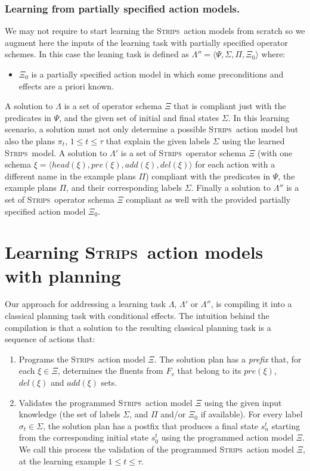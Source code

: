 \documentclass[letterpaper]{article} %
\newcommand{\tup}[1]{{\langle #1 \rangle}}
\newcommand{\strips}{\textsc{Strips}}     %
\begin{document}
\subsubsection{Learning from partially specified action models.}
We may not require to start learning the \strips\ action models from scratch so we augment here the inputs of the learning task with partially specified operator schemes. In this case the leaning task is defined as $\Lambda''=\tup{\Psi,\Sigma,\Pi,\Xi_0}$ where:
\begin{itemize}
\item $\Xi_0$ is a partially specified action model in which some preconditions and effects are a priori known.
\end{itemize}

A solution to $\Lambda$ is a set of operator schema $\Xi$ that is compliant just with the predicates in $\Psi$, and the given set of initial and final states $\Sigma$. In this learning scenario, a solution must not only determine a possible \strips\ action model but also the plans $\pi_t$, {\tt\small $1\leq t\leq \tau$} that explain the given labels $\Sigma$ using the learned \strips\ model. A solution to $\Lambda'$ is a set of \strips\ operator schema $\Xi$ (with one schema $\xi=\tup{head(\xi),pre(\xi),add(\xi),del(\xi)}$ for each action with a different name in the example plans $\Pi$) compliant with the predicates in $\Psi$, the example plans $\Pi$, and their corresponding labels $\Sigma$.  Finally a solution to $\Lambda''$ is a set of \strips\ operator schema $\Xi$ compliant as well with the provided partially specified action model $\Xi_0$. 


\section{Learning \strips\ action models with planning}
Our approach for addressing a learning task $\Lambda$, $\Lambda'$ or $\Lambda''$, is compiling it into a classical planning task with conditional effects. The intuition behind the compilation is that a solution to the resulting classical planning task is a sequence of actions that:
\begin{enumerate}
\item Programs the \strips\ action model $\Xi$. The solution plan has a {\em prefix} that, for each $\xi\in\Xi$, determines the fluents from $F_v$ that belong to its $pre(\xi)$, $del(\xi)$ and $add(\xi)$ sets.
\item Validates the programmed \strips\ action model $\Xi$ using the given input knowledge (the set of labels $\Sigma$, and $\Pi$ and/or $\Xi_0$ if available). For every label $\sigma_t\in \Sigma$, the solution plan has a postfix that produces a final state $s_{n}^t$ starting from the corresponding initial state $s_0^t$ using the programmed action model $\Xi$. We call this process the validation of the programmed \strips\ action model $\Xi$, at the learning example {\small $1\leq t\leq \tau$}. %
\end{enumerate}
\end{document}
